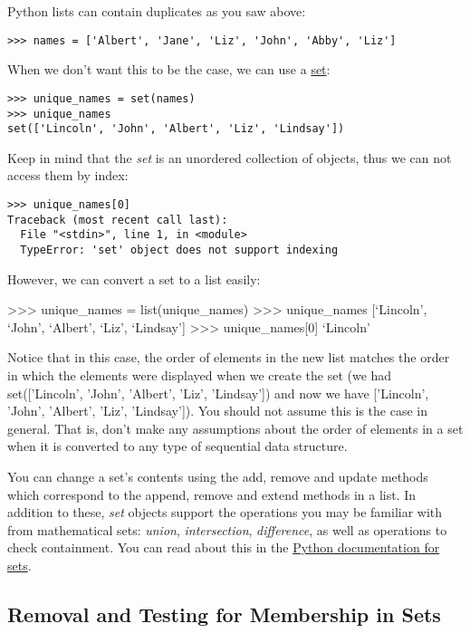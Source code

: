 Python lists can contain duplicates as you saw above:

\begin{verbatim}
>>> names = ['Albert', 'Jane', 'Liz', 'John', 'Abby', 'Liz']
\end{verbatim}

When we don't want this to be the case, we can use a
\href{https://docs.python.org/2/library/stdtypes.html\#set}{set}:

\begin{verbatim}
>>> unique_names = set(names)
>>> unique_names
set(['Lincoln', 'John', 'Albert', 'Liz', 'Lindsay'])
\end{verbatim}

Keep in mind that the \emph{set} is an unordered collection of objects,
thus we can not access them by index:

\begin{verbatim}
>>> unique_names[0]
Traceback (most recent call last):
  File "<stdin>", line 1, in <module>
  TypeError: 'set' object does not support indexing
\end{verbatim}

However, we can convert a set to a list easily:

\textgreater{}\textgreater{}\textgreater{} unique\_names =
list(unique\_names) \textgreater{}\textgreater{}\textgreater{}
unique\_names {[}`Lincoln', `John', `Albert', `Liz', `Lindsay'{]}
\textgreater{}\textgreater{}\textgreater{} unique\_names{[}0{]}
`Lincoln'

Notice that in this case, the order of elements in the new list matches
the order in which the elements were displayed when we create the set
(we had set({[}'Lincoln', 'John', 'Albert', 'Liz',
'Lindsay'{]}) and now we have {[}'Lincoln', 'John', 'Albert', 'Liz',
'Lindsay'{]}). You should not assume this is the case in general. That
is, don't make any assumptions about the order of elements in a set when
it is converted to any type of sequential data structure.

You can change a set's contents using the add, remove and update methods
which correspond to the append, remove and extend methods in a list. In
addition to these, \emph{set} objects support the operations you may be
familiar with from mathematical sets: \emph{union}, \emph{intersection},
\emph{difference}, as well as operations to check containment. You can
read about this in the
\href{https://docs.python.org/2/library/stdtypes.html\#set}{Python
documentation for sets}.

\subsection{Removal and Testing for Membership in
Sets}\label{removal-and-testing-for-membership-in-sets}

